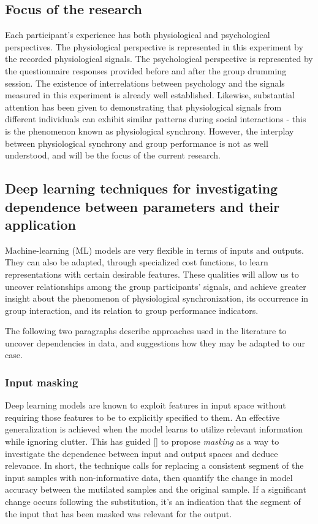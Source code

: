 \documentclass[a4paper, 11pt]{article}      %
\begin{document}
\subsection{Focus of the research}
Each participant's experience has both physiological and psychological perspectives. The physiological perspective is represented in this experiment by the recorded physiological signals. The psychological perspective is represented by the questionnaire responses provided before and after the group drumming session. The existence of interrelations between psychology and the signals measured in this experiment is already well established. Likewise, substantial attention has been given to demonstrating that physiological signals from different individuals can exhibit similar patterns during social interactions - this is the phenomenon known as physiological synchrony. However, the interplay between physiological synchrony and group performance is not as well understood, and will be the focus of the current research.

\subsection{Deep learning techniques for investigating dependence between parameters and their application}

Machine-learning (ML) models are very flexible in terms of inputs and outputs. They can also be adapted, through specialized cost functions, to learn representations with certain desirable features. These qualities will allow us to uncover relationships among the group participants' signals, and achieve greater insight about the phenomenon of physiological synchronization, its occurrence in group interaction, and its relation to group performance indicators.

The following two paragraphs describe approaches used in the literature to uncover dependencies in data, and suggestions how they may be adapted to our case.

\subsubsection{Input masking}
Deep learning models are known to exploit features in input space without requiring those features to be to explicitly specified to them. An effective generalization is achieved when the model learns to utilize relevant information while ignoring clutter. This has guided [] to propose \emph{masking} as a way to investigate the dependence between input and output spaces and deduce relevance. In short, the technique calls for replacing a consistent segment of the input samples with non-informative data, then quantify the change in model accuracy between the mutilated samples and the original sample. If a significant change occurs following the substitution, it's an indication that the segment of the input that has been masked was relevant for the output.
\end{document}
